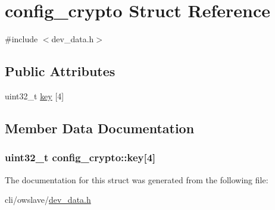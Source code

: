 \hypertarget{structconfig__crypto}{\section{config\-\_\-crypto Struct Reference}
\label{structconfig__crypto}
}


{\ttfamily \#include $<$dev\-\_\-data.\-h$>$}

\subsection*{Public Attributes}
\begin{DoxyCompactItemize}
\item 
uint32\-\_\-t \hyperlink{structconfig__crypto_aab0644bb16c2a693422840da497ec2d4}{key} \mbox{[}4\mbox{]}
\end{DoxyCompactItemize}


\subsection{Member Data Documentation}
\hypertarget{structconfig__crypto_aab0644bb16c2a693422840da497ec2d4}{
\subsubsection[{key}]{\setlength{\rightskip}{0pt plus 5cm}uint32\-\_\-t config\-\_\-crypto\-::key\mbox{[}4\mbox{]}}}\label{structconfig__crypto_aab0644bb16c2a693422840da497ec2d4}


The documentation for this struct was generated from the following file\-:\begin{DoxyCompactItemize}
\item 
cli/owslave/\hyperlink{dev__data_8h}{dev\-\_\-data.\-h}\end{DoxyCompactItemize}
